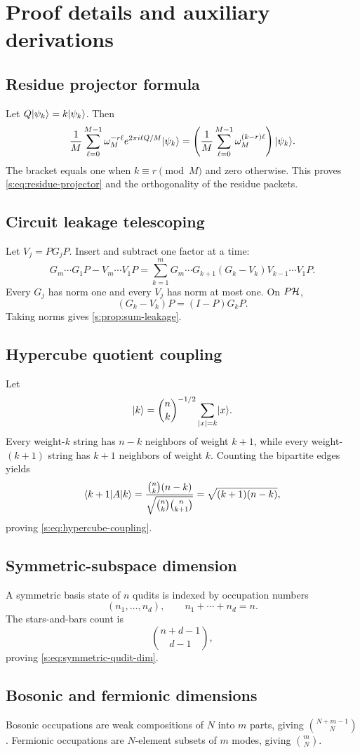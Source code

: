 \section{Proof details and auxiliary derivations}
\label{s:app:proofs}

\subsection{Residue projector formula}
Let $Q\lvert \psi_k\rangle=k\lvert \psi_k\rangle$. Then
\[
\frac1M\sum_{\ell=0}^{M-1}
\omega_M^{-r\ell}e^{2\pi i\ell Q/M}\lvert \psi_k\rangle
=
\left(
\frac1M\sum_{\ell=0}^{M-1}
\omega_M^{(k-r)\ell}
\right)\lvert \psi_k\rangle.
\]
The bracket equals one when $k\equiv r\pmod M$ and zero otherwise. This proves \cref{s:eq:residue-projector} and the orthogonality of the residue packets.

\subsection{Circuit leakage telescoping}
Let $V_j=PG_jP$. Insert and subtract one factor at a time:
\[
G_m\cdots G_1P-V_m\cdots V_1P
=
\sum_{k=1}^m
G_m\cdots G_{k+1}(G_k-V_k)V_{k-1}\cdots V_1P.
\]
Every $G_j$ has norm one and every $V_j$ has norm at most one. On $P\mathcal H$,
\[
(G_k-V_k)P=(I-P)G_kP.
\]
Taking norms gives \cref{s:prop:sum-leakage}.

\subsection{Hypercube quotient coupling}
Let
\[
\lvert k\rangle
=
\binom nk^{-1/2}
\sum_{|x|=k}\lvert x\rangle.
\]
Every weight-$k$ string has $n-k$ neighbors of weight $k+1$, while every weight-$(k+1)$ string has $k+1$ neighbors of weight $k$. Counting the bipartite edges yields
\[
\langle k+1\rvert A\lvert k\rangle
=
\frac{\binom nk(n-k)}
{\sqrt{\binom nk\binom n{k+1}}}
=
\sqrt{(k+1)(n-k)},
\]
proving \cref{s:eq:hypercube-coupling}.

\subsection{Symmetric-subspace dimension}
A symmetric basis state of $n$ qudits is indexed by occupation numbers
\[
(n_1,\ldots,n_d),
\qquad
n_1+\cdots+n_d=n.
\]
The stars-and-bars count is
\[
\binom{n+d-1}{d-1},
\]
proving \cref{s:eq:symmetric-qudit-dim}.

\subsection{Bosonic and fermionic dimensions}
Bosonic occupations are weak compositions of $N$ into $m$ parts, giving $\binom{N+m-1}{N}$. Fermionic occupations are $N$-element subsets of $m$ modes, giving $\binom mN$.

